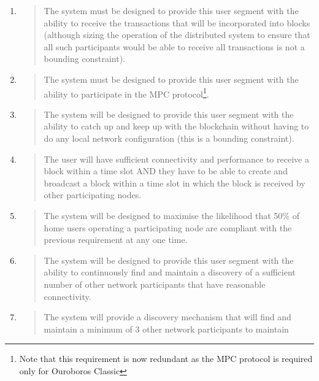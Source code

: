 \documentclass[11pt,a4paper]{article}
\begin{document}
\begin{enumerate}
\def\labelenumi{\arabic{enumi}.}
\item
  \begin{quote}
  The system must be designed to provide this user segment with the
  ability to receive the transactions that will be incorporated into
  blocks (although sizing the operation of the distributed system to
  ensure that all such participants would be able to receive all
  transactions is not a bounding constraint).
  \end{quote}
\item
  \begin{quote}
  The system must be designed to provide this user segment with the
  ability to participate in the MPC protocol\footnote{Note that this
    requirement is now redundant as the MPC protocol is required only
    for Ouroboros Classic}.
  \end{quote}
\item
  \begin{quote}
  The system will be designed to provide this user segment with the
  ability to catch up and keep up with the blockchain without having to
  do any local network configuration (this is a bounding constraint).
  \end{quote}
\item
  \begin{quote}
  The user will have sufficient connectivity and performance to receive
  a block within a time slot AND they have to be able to create and
  broadcast a block within a time slot in which the block is received by
  other participating nodes.
  \end{quote}
\item
  \begin{quote}
  The system will be designed to maximise the likelihood that 50\% of
  home users operating a participating node are compliant with the
  previous requirement at any one time.
  \end{quote}
\item
  \begin{quote}
  The system will be designed to provide this user segment with the
  ability to continuously find and maintain a discovery of a sufficient
  number of other network participants that have reasonable
  connectivity.
  \end{quote}
\item
  \begin{quote}
  The system will provide a discovery mechanism that will find and
  maintain a minimum of 3 other network participants to maintain

\end{quote}
\end{enumerate}
\end{document}
